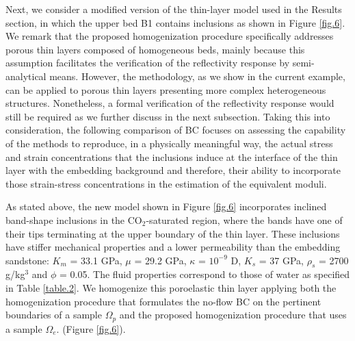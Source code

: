 \documentclass[draft]{agujournal2019}
\begin{document}
Next, we consider a modified version of the thin-layer model used in the Results section, in which the upper bed B1 contains inclusions as shown in Figure \ref{fig.6}. We remark that the proposed homogenization procedure specifically addresses porous thin layers composed of homogeneous beds, mainly because this assumption facilitates the verification of the reflectivity response by semi-analytical means. However, the methodology, as we show in the current example, can be applied to porous thin layers presenting more complex heterogeneous structures. Nonetheless, a formal verification of the reflectivity response would still be required as we further discuss in the next subsection. Taking this into consideration, the following comparison of BC focuses on assessing the capability of the methods to reproduce, in a physically meaningful way, the actual stress and strain concentrations that the inclusions induce at the interface of the thin layer with the embedding background and therefore, their ability to incorporate those strain-stress concentrations in the estimation of the equivalent moduli.

As stated above, the new model shown in Figure \ref{fig.6} incorporates  inclined band-shape inclusions in the CO$_2$-saturated region, where the bands have one of their tips terminating at the upper boundary of the thin layer. These inclusions have stiffer mechanical properties and a lower permeability than the embedding sandstone: $K_m$ = 33.1 GPa,  $\mu$ = 29.2 GPa, $\kappa$ = $10^{-9}$ D, $K_s$ = 37 GPa, $\rho_s$ = 2700 g/kg$^3$ and $\phi$ = 0.05. The fluid properties correspond to those of water as specified in Table \ref{table.2}. We homogenize this poroelastic thin layer applying both the homogenization procedure that formulates the no-flow BC on the pertinent boundaries of a sample $\Omega_p$  and the proposed homogenization procedure that uses a sample $\Omega_e$. (Figure \ref{fig.6}).
\end{document}

